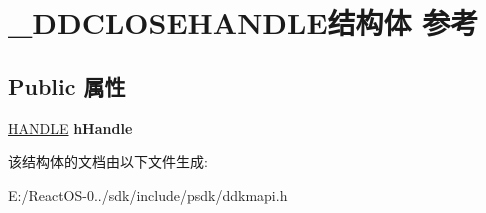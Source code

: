 \hypertarget{struct___d_d_c_l_o_s_e_h_a_n_d_l_e}{}\section{\+\_\+\+D\+D\+C\+L\+O\+S\+E\+H\+A\+N\+D\+L\+E结构体 参考}
\label{struct___d_d_c_l_o_s_e_h_a_n_d_l_e}
\subsection*{Public 属性}
\begin{DoxyCompactItemize}
\item 
\mbox{\label{struct___d_d_c_l_o_s_e_h_a_n_d_l_e_a8a2a4ea8b5b26b2f7ee7056d8016f6ab}} 
\hyperlink{interfacevoid}{H\+A\+N\+D\+LE} {\bfseries h\+Handle}
\end{DoxyCompactItemize}


该结构体的文档由以下文件生成\+:\begin{DoxyCompactItemize}
\item 
E\+:/\+React\+O\+S-\/0../sdk/include/psdk/ddkmapi.\+h\end{DoxyCompactItemize}

